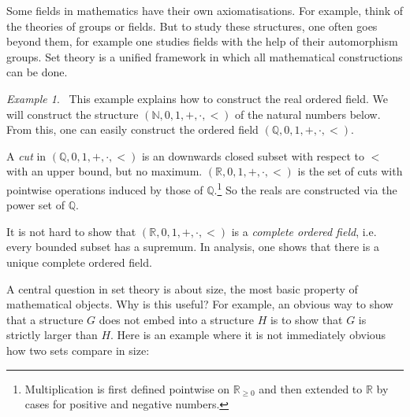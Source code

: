 \documentclass[a4paper, 11pt]{amsart}
\theoremstyle{remark}
\newtheorem{example}[example]{Example}
\newcommand{\NN}{\mathbb{N}}
\newcommand{\QQ}{\mathbb{Q}}
\newcommand{\RR}{\mathbb{R}}
\begin{document}
Some fields in mathematics have their own axiomatisations. 
For example, think of the theories of groups or fields. 
But to study these structures, one often goes beyond them, for example one studies fields with the help of their automorphism groups. 
Set theory is a unified framework in which all mathematical constructions can be done. 



\begin{example} \ 
This example explains how to construct the real ordered field. 
We will construct the structure $(\NN,0,1,+,\cdot,<)$ of the natural numbers below. 
From this, one can easily construct the ordered field $(\QQ,0,1,+,\cdot,<)$. 

A \emph{cut} in $(\QQ,0,1,+,\cdot,<)$ is an downwards closed subset with respect to $<$ with an upper bound, but no maximum. 
$(\RR,0,1,+,\cdot,<)$ is the set of cuts with pointwise operations induced by those of $\QQ$.\footnote{Multiplication is first defined pointwise on $\RR_{\geq 0}$ and then extended to $\RR$ by cases for positive and negative numbers.} 
So the reals are constructed via the power set of $\QQ$. 

It is not hard to show that $(\RR,0,1,+,\cdot,<)$ is a \emph{complete ordered field}, i.e. every bounded subset has a supremum. 
In analysis, one shows that there is a unique complete ordered field. 
\end{example} 

A central question in set theory is about size, the most basic property of mathematical objects. 
Why is this useful? 
For example, an obvious way to show that a structure $G$ does not embed into a structure $H$ is to show that $G$ is strictly larger than $H$. 
Here is an example where it is not immediately obvious how two sets compare in size: 
\end{document}
